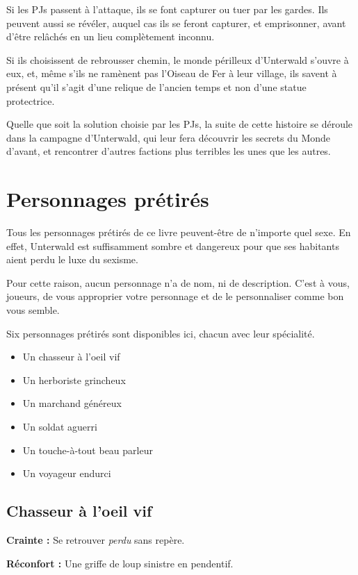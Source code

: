 \documentclass[10pt,twoside,twocolumn,openany,bg=print,justified]{dndbook}
\begin{document}
Si les PJs passent à l'attaque, ils se font capturer ou tuer par les gardes. Ils peuvent aussi se révéler, auquel cas ils se feront capturer, et emprisonner, avant d'être relâchés en un lieu complètement inconnu.

Si ils choisissent de rebrousser chemin, le monde périlleux d'Unterwald s'ouvre à eux, et, même s'ils ne ramènent pas l'Oiseau de Fer à leur village, ils savent à présent qu'il s'agit d'une relique de l'ancien temps et non d'une statue protectrice.

Quelle que soit la solution choisie par les PJs, la suite de cette histoire se déroule dans la campagne d'Unterwald, qui leur fera découvrir les secrets du Monde d'avant, et rencontrer d'autres factions plus terribles les unes que les autres.

\section{Personnages prétirés}

Tous les personnages prétirés de ce livre peuvent-être de n'importe quel sexe. En effet, Unterwald est suffisamment sombre et dangereux pour que ses habitants aient perdu le luxe du sexisme.

Pour cette raison, aucun personnage n'a de nom, ni de description. C'est à vous, joueurs, de vous approprier votre personnage et de le personnaliser comme bon vous semble.

Six personnages prétirés sont disponibles ici, chacun avec leur spécialité. 

\begin{itemize}
	\item Un chasseur à l'oeil vif
	\item Un herboriste grincheux
	\item Un marchand généreux
	\item Un soldat aguerri
	\item Un touche-à-tout beau parleur
	\item Un voyageur endurci
\end{itemize}

\subsection*{Chasseur à l'oeil vif}

\textbf{Crainte :} Se retrouver \textit{perdu} sans repère.

\textbf{Réconfort :} Une griffe de loup sinistre en pendentif.
\end{document}
